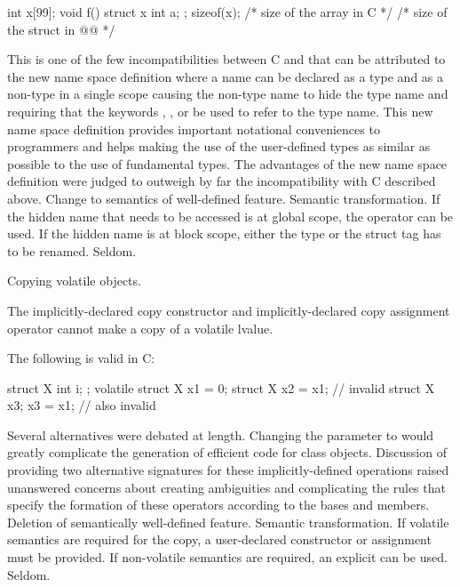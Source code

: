 \begin{example}
\begin{codeblock}
int x[99];
void f() {
  struct x { int a; };
  sizeof(x);  /* size of the array in C */
  /* size of the struct in @\textit{\textrm{\Cpp{}}}@ */
}
\end{codeblock}
\end{example}
\rationale
This is one of the few incompatibilities between C and \Cpp{} that
can be attributed to the new \Cpp{} name space definition where a
name can be declared as a type and as a non-type in a single scope
causing the non-type name to hide the type name and requiring that
the keywords , ,  or  be used to refer to the type name.
This new name space definition provides important notational
conveniences to \Cpp{} programmers and helps making the use of the
user-defined types as similar as possible to the use of fundamental
types.
The advantages of the new name space definition were judged to
outweigh by far the incompatibility with C described above.
\effect
Change to semantics of well-defined feature.
\difficulty
Semantic transformation.
If the hidden name that needs to be accessed is at global scope,
the \tcode{::} \Cpp{} operator can be used.
If the hidden name is at block scope, either the type or the struct
tag has to be renamed.
\howwide
Seldom.

\change
Copying volatile objects.

The implicitly-declared copy constructor and
implicitly-declared copy assignment operator
cannot make a copy of a volatile lvalue.
\begin{example}
The following is valid in C:
\begin{codeblock}
struct X { int i; };
volatile struct X x1 = {0};
struct X x2 = x1;               // invalid \Cpp{}
struct X x3;
x3 = x1;                        // also invalid \Cpp{}
\end{codeblock}
\end{example}

\rationale
Several alternatives were debated at length.
Changing the parameter to
would greatly complicate the generation of
efficient code for class objects.
Discussion of
providing two alternative signatures for these
implicitly-defined operations raised
unanswered concerns about creating
ambiguities and complicating
the rules that specify the formation of
these operators according to the bases and
members.
\effect
Deletion of semantically well-defined feature.
\difficulty
Semantic transformation.
If volatile semantics are required for the copy,
a user-declared constructor or assignment must
be provided.
If non-volatile semantics are required,
an explicit
can be used.
\howwide
Seldom.

